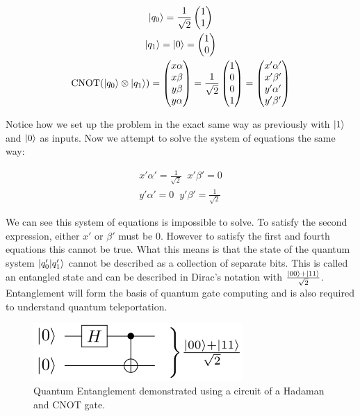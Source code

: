 \documentclass[conference]{IEEEtran}
\begin{document}
\begin{gather*}
\ket{q_0} = \frac{1}{\sqrt{2}}\begin{pmatrix}1\\1\end{pmatrix}\\
\ket{q_1} = \ket{0} = \begin{pmatrix}1\\0\end{pmatrix}\\
\text{CNOT}(\ket{q_0} \otimes \ket{q_1}) =
\begin{pmatrix}x\alpha\\x\beta\\y\beta\\y\alpha\end{pmatrix} =
\frac{1}{\sqrt{2}}\begin{pmatrix}1\\0\\0\\1\end{pmatrix} = \begin{pmatrix}x'\alpha'\\x'\beta'\\y'\alpha'\\y'\beta'\end{pmatrix}
\end{gather*}

Notice how we set up the problem in the exact same way as previously with $\ket{1}$ and $\ket{0}$ as inputs. Now we attempt to solve the system of equations the same way:

\begin{gather*}
x'\alpha' = \frac{1}{\sqrt{2}} \;\; x'\beta' = 0\\
y'\alpha' = 0 \;\; y'\beta' = \frac{1}{\sqrt{2}}
\end{gather*}

We can see this system of equations is impossible to solve. To satisfy the second expression, either $x'$ or $\beta'$ must be $0$. However to satisfy the first and fourth equations this cannot be true. What this means is that the state of the quantum system $\ket{q_0'|q_1'}$ cannot be described as a collection of separate bits. This is called an entangled state and can be described in Dirac's notation with $\frac{\ket{00}+\ket{11}}{\sqrt{2}}$. Entanglement will form the basis of quantum gate computing and is also required to understand quantum teleportation.

\begin{figure}[htbp]
\centerline{\includegraphics[width=8cm]{entanglement_circuit.png}}
\caption{Quantum Entanglement demonstrated using a circuit of a Hadaman and CNOT gate.}
\label{entanglement}
\end{figure}
\end{document}
